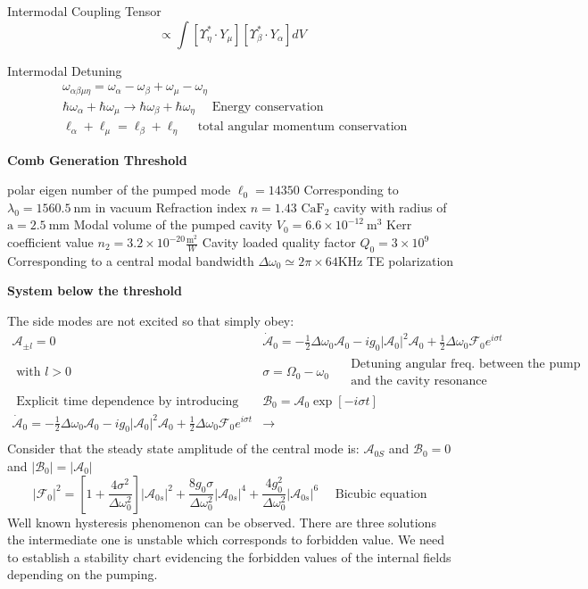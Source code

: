 \documentclass[main.tex]{subfiles}
\begin{document}
Intermodal Coupling
Tensor
$$
\propto \int\left[\Upsilon_\eta^* \cdot Y_\mu\right]\left[\Upsilon_\beta^* \cdot Y_\alpha\right] d V
$$

Intermodal Detuning
$$
\begin{aligned}
&\omega_{\alpha \beta \mu \eta}=\omega_\alpha-\omega_\beta+\omega_\mu-\omega_\eta \\
&\hbar \omega_\alpha+\hbar \omega_\mu \rightarrow \hbar \omega_\beta+\hbar \omega_\eta \quad \text { Energy conservation } \\
&\ell_\alpha+\ell_\mu=\ell_\beta+\ell_\eta \quad \text { total angular momentum conservation }
\end{aligned}
$$

\textbf{Comb Generation Threshold}

polar eigen number of the pumped mode $\ell_0=14350$
Corresponding to $\lambda_0=1560.5 \mathrm{~nm}$ in vacuum
Refraction index $n=1.43$
$\mathrm{CaF}_2$ cavity with radius of $\mathrm{a}=2.5 \mathrm{~mm}$
Modal volume of the pumped cavity $V_0=6.6 \times 10^{-12} \mathrm{~m}^3$
Kerr coefficient value $n_2=3.2 \times 10^{-20} \frac{\mathrm{m}^2}{W}$
Cavity loaded quality factor $Q_0=3 \times 10^9$
Corresponding to a central modal bandwidth $\Delta \omega_0 \simeq 2 \pi \times 64 \mathrm{KHz}$
TE polarization

\textbf{System below the threshold}

The side modes are not excited so that simply obey:
$$
\begin{array}{cc}
\mathcal{A}_{\pm l}=0 & \dot{\mathcal{A}}_0=-\frac{1}{2} \Delta \omega_0 \mathcal{A}_0-i g_0\left|\mathcal{A}_0\right|^2 \mathcal{A}_0+\frac{1}{2} \Delta \omega_0 \mathcal{F}_0 e^{i \sigma t} \\
\text { with } l>0 & \sigma=\Omega_0-\omega_0 \quad \begin{array}{l}
\text { Detuning angular freq. between the pump freq. } \\
\text { and the cavity resonance }
\end{array} \\
\text { Explicit time dependence by introducing variable transformation } & \mathcal{B}_0=\mathcal{A}_0 \exp [-i \sigma t] \\
\dot{\mathcal{A}}_0=-\frac{1}{2} \Delta \omega_0 \mathcal{A}_0-i g_0\left|\mathcal{A}_0\right|^2 \mathcal{A}_0+\frac{1}{2} \Delta \omega_0 \mathcal{F}_0 e^{i \sigma t} & \longrightarrow \\
\end{array}
$$
Consider that the steady state amplitude of the central mode is: $\mathcal{A}_{0 S}$ and $\mathcal{B}_0=0$ and $\left|\mathcal{B}_0\right|=\left|\mathcal{A}_0\right|$
$$
\left|\mathcal{F}_0\right|^2=\left[1+\frac{4 \sigma^2}{\Delta \omega_0^2}\right]\left|\mathcal{A}_{0 s}\right|^2+\frac{8 g_0 \sigma}{\Delta \omega_0^2}\left|\mathcal{A}_{0 s}\right|^4+\frac{4 g_0^2}{\Delta \omega_0^2}\left|\mathcal{A}_{0 s}\right|^6 \quad \text { Bicubic equation }
$$
Well known hysteresis phenomenon can be observed. There are three solutions the intermediate one is unstable which corresponds to forbidden value.
We need to establish a stability chart evidencing the forbidden values of the internal fields depending on the pumping.
\end{document}
